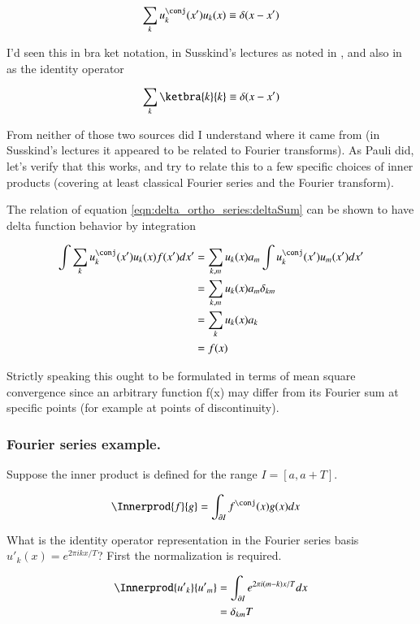 \begin{align}\label{eqn:delta_ortho_series:deltaSum}
\sum_{k} u_k^\conj(x') u_k(x) \equiv \delta(x-x') 
\end{align}

I'd seen this in bra ket notation, in Susskind's lectures as noted in \cite{PJQmSusskind}, and also in \cite{mcmahon2005qmd} as the
identity operator

\begin{align}
\sum_{k} \ketbra{k}{k} \equiv \delta(x-x') 
\end{align}

From neither of those two sources did I understand where it came from (in Susskind's lectures it appeared to be
related to Fourier transforms).
As Pauli did, let's verify that this works, and try to relate this to a few specific choices of inner products (covering at
least classical Fourier series and the Fourier transform).

The relation of equation \ref{eqn:delta_ortho_series:deltaSum} can be shown to have delta function behavior by integration

\begin{align*}
\int \sum_{k} u_k^\conj(x') u_k(x) f(x') dx'
&=
\sum_{k,m} u_k(x) a_m \int u_k^\conj(x') u_m(x') dx' \\
&=
\sum_{k,m} u_k(x) a_m \delta_{km} \\
&=
\sum_{k} u_k(x) a_k \\
&=
f(x) 
\end{align*}

Strictly speaking this ought to be formulated in terms of mean square convergence since an arbitrary function f(x) 
may differ from its Fourier sum at specific points (for example at points of discontinuity).

\subsubsection{Fourier series example. }

Suppose the inner product is defined for the range $I = [a, a+T]$.

\begin{align*}
\Innerprod{f}{g} &= \int_{\partial I} f^\conj(x) g(x) dx
\end{align*}

What is the identity operator representation in the Fourier series basis ${u'}_k(x) = e^{ 2 \pi i k x / T}$?  First the 
normalization is required.

\begin{align*}
\Innerprod{{u'}_k}{{u'}_m} 
&= \int_{\partial I} e^{ 2 \pi i (m-k) x /T } dx  \\
&= \delta_{km} T
\end{align*}

